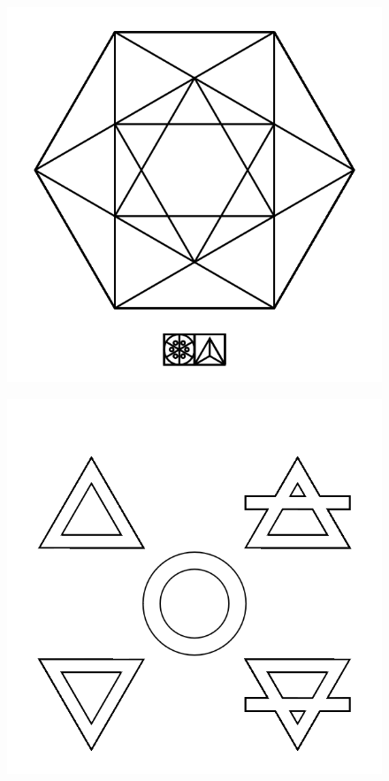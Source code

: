 \documentclass[17pt]{extreport}
\begin{document}
	\begin{figure}
		\centering
		\includegraphics[width=6.25in]{imageserver/uploadimages/image5.png}
	\end{figure}
	
	\begin{figure}
		\centering
		\includegraphics[width=6.25in]{imageserver/uploadimages/image6.png}
	\end{figure}
	
\end{document}
